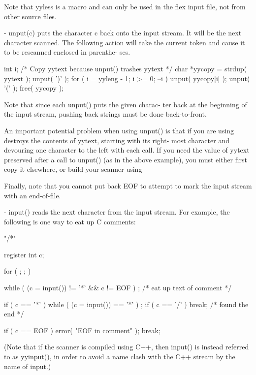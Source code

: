 \documentclass[12pt,spanish,twocolumn,lettersize]{article}
\begin{document}
       Note  that  yyless  is a macro and can only be used in the
       flex input file, not from other source files.

       -      unput(c) puts the character c back onto  the  input
	      stream.	It  will  be  the next character scanned.
	      The following action will take  the  current  token
	      and  cause it to be rescanned enclosed in parenthe-
	      ses.

		  {
		  int i;
		  /* Copy yytext because unput() trashes yytext */
		  char *yycopy = strdup( yytext );
		  unput( ')' );
		  for ( i = yyleng - 1; i >= 0; --i )
		      unput( yycopy[i] );
		  unput( '(' );
		  free( yycopy );
		  }

	      Note that since each unput() puts the given charac-
	      ter  back	 at  the  beginning  of the input stream,
	      pushing back strings must be done back-to-front.

       An important potential problem when using unput() is  that
       if you are using %
       destroys the contents of yytext, starting with its  right-
       most  character	and  devouring	one character to the left
       with each call.	If you need the value of yytext preserved
       after  a	 call  to  unput() (as in the above example), you
       must either first copy it elsewhere, or build your scanner
       using %

       Finally,	 note  that you cannot put back EOF to attempt to
       mark the input stream with an end-of-file.

       -      input() reads the next  character	 from  the  input
	      stream.	For  example, the following is one way to
	      eat up C comments:

		  "/*"	      {
			      register int c;

			      for ( ; ; )
				  {
				  while ( (c = input()) != '*' &&
					  c != EOF )
				      ;	   /* eat up text of comment */

				  if ( c == '*' )
				      {
				      while ( (c = input()) == '*' )
					  ;
				      if ( c == '/' )
					  break;    /* found the end */
				      }

				  if ( c == EOF )
				      {
				      error( "EOF in comment" );
				      break;
				      }
				  }
			      }

	      (Note that if the scanner is  compiled  using  C++,
	      then  input()  is instead referred to as yyinput(),
	      in order to avoid a name clash with the C++  stream
	      by the name of input.)
\end{document}
